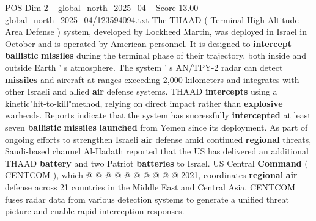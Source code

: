 \begin{textsample}{POS Dim 2 – global\_north\_2025\_04 – Score 13.00 – global\_north\_2025\_04/123594094.txt}
The THAAD ( Terminal High Altitude Area Defense ) system, developed by Lockheed Martin, was deployed in Israel in October and is operated by American personnel.
It is designed to \textbf{intercept} \textbf{ballistic} \textbf{missiles} during the terminal phase of their trajectory, both inside and outside Earth ' s atmosphere.
The system ' s AN/TPY-2 radar can detect \textbf{missiles} and aircraft at ranges exceeding 2,000 kilometers and integrates with other Israeli and allied \textbf{air} defense systems.
THAAD \textbf{intercepts} using a kinetic"hit-to-kill"method, relying on direct impact rather than \textbf{explosive} warheads.
Reports indicate that the system has successfully \textbf{intercepted} at least seven \textbf{ballistic} \textbf{missiles} \textbf{launched} from Yemen since its deployment.
As part of ongoing efforts to strengthen Israeli \textbf{air} defense amid continued \textbf{regional} threats, Saudi-based channel Al-Hadath reported that the US has delivered an additional THAAD \textbf{battery} and two Patriot \textbf{batteries} to Israel.
US Central \textbf{Command} ( CENTCOM ), which @ @ @ @ @ @ @ @ @ @ 2021, coordinates \textbf{regional} \textbf{air} defense across 21 countries in the Middle East and Central Asia.
CENTCOM fuses radar data from various detection systems to generate a unified threat picture and enable rapid interception responses.

\end{textsample}
